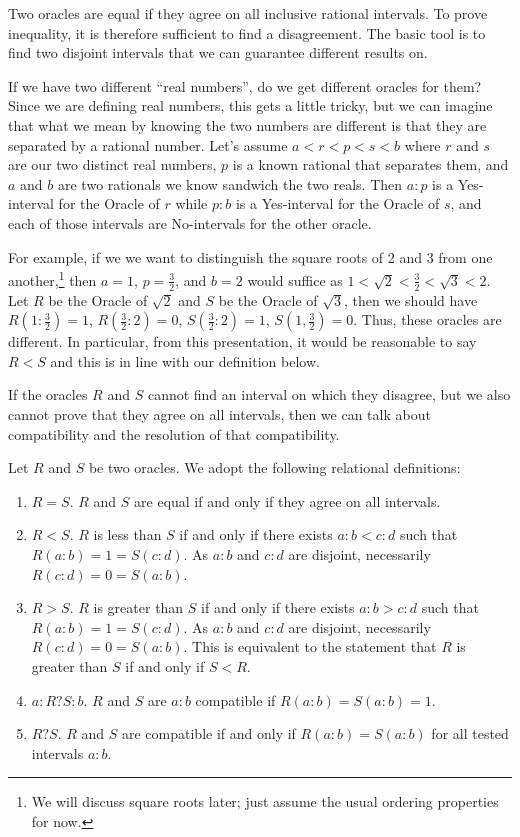 \documentclass[12pt]{article}
\begin{document}
Two oracles are equal if they agree on all inclusive rational intervals. To prove inequality, it is therefore sufficient to find a disagreement. The basic tool is to find two disjoint intervals that we can guarantee different results on. 

If we have two different ``real numbers'', do we get different oracles for them? Since we are defining real numbers, this gets a little tricky, but we can imagine that what we mean by knowing the two numbers are different is that they are separated by a rational number. Let's assume $a < r < p < s < b$ where $r$ and $s$ are our two distinct real numbers,  $p$ is a known rational that separates them, and $a$ and $b$ are two rationals we know sandwich the two reals. Then $a:p$ is a Yes-interval for the Oracle of $r$ while $p:b$ is a Yes-interval for the Oracle of $s$, and each of those intervals are No-intervals for the other oracle. 

For example, if we we want to distinguish the square roots of 2 and 3 from one another,\footnote{We will discuss square roots later; just assume the usual ordering properties for now.} then $a = 1$, $p = \tfrac{3}{2}$, and $b = 2$ would suffice as $1 < \sqrt{2} < \tfrac{3}{2} < \sqrt{3} < 2$. Let $R$ be the Oracle of $\sqrt{2}$ and $S$ be the Oracle of $\sqrt{3}$, then we should have $R(1:\tfrac{3}{2}) = 1$, $R(\tfrac{3}{2}:2) = 0$,  $S(\tfrac{3}{2}:2) = 1$, $S(1, \tfrac{3}{2}) = 0$. Thus, these oracles are different. In particular, from this presentation, it would be reasonable to say $R < S$ and this is in line with our definition below.

If the oracles $R$ and $S$ cannot find an interval on which they disagree, but we also cannot prove that they agree on all intervals, then we can talk about compatibility and the resolution of that compatibility.

Let $R$ and $S$ be two oracles. We adopt the following relational definitions:

\begin{enumerate}
    \item $R=S$. $R$ and $S$ are equal if and only if they agree on all intervals. 
    \item $R < S$. $R$ is less than $S$ if and only if there exists $a:b < c:d$ such that $R(a:b) =1 = S(c:d)$. As $a:b$ and $c:d$ are disjoint, necessarily $R(c:d) = 0 = S(a:b)$. 
    \item $R > S$. $R$ is greater than $S$ if and only if there exists $a:b > c:d$ such that $R(a:b) =1 = S(c:d)$. As $a:b$ and $c:d$ are disjoint, necessarily $R(c:d) = 0 = S(a:b)$. This is equivalent to the statement that $R$ is greater than $S$ if and only if $S < R$. 
    \item $a:R?S:b$. $R$ and $S$ are $a:b$ compatible if $R(a:b)=S(a:b) = 1$.
    \item $R ? S$. $R$ and $S$ are compatible if and only if $R(a:b) = S(a:b)$ for all tested intervals $a:b$. 
\end{enumerate}
\end{document}
